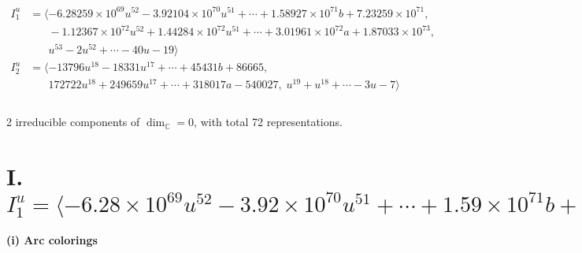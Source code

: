 \documentclass[1p]{elsarticle_modified}
\theoremstyle{definition}
\begin{document}
\begin{align*}
I^u_{1}&=\langle 
-6.28259\times10^{69} u^{52}-3.92104\times10^{70} u^{51}+\cdots+1.58927\times10^{71} b+7.23259\times10^{71},\\
\phantom{I^u_{1}}&\phantom{= \langle  }-1.12367\times10^{72} u^{52}+1.44284\times10^{72} u^{51}+\cdots+3.01961\times10^{72} a+1.87033\times10^{73},\\
\phantom{I^u_{1}}&\phantom{= \langle  }u^{53}-2 u^{52}+\cdots-40 u-19\rangle \\
I^u_{2}&=\langle 
-13796 u^{18}-18331 u^{17}+\cdots+45431 b+86665,\\
\phantom{I^u_{2}}&\phantom{= \langle  }172722 u^{18}+249659 u^{17}+\cdots+318017 a-540027,\;u^{19}+u^{18}+\cdots-3 u-7\rangle \\
\\
\end{align*}
\raggedright * 2 irreducible components of $\dim_{\mathbb{C}}=0$, with total 72 representations.\\
\newpage
\renewcommand{\arraystretch}{1}
\centering \section*{I. $I^u_{1}= \langle -6.28\times10^{69} u^{52}-3.92\times10^{70} u^{51}+\cdots+1.59\times10^{71} b+7.23\times10^{71},\;-1.12\times10^{72} u^{52}+1.44\times10^{72} u^{51}+\cdots+3.02\times10^{72} a+1.87\times10^{73},\;u^{53}-2 u^{52}+\cdots-40 u-19 \rangle$}
\flushleft \textbf{(i) Arc colorings}\\
\end{document}
